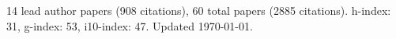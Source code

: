 14 lead author papers (908 citations),
60 total papers (2885 citations).\newline
h-index: 31, g-index: 53, i10-index: 47. Updated \today.
